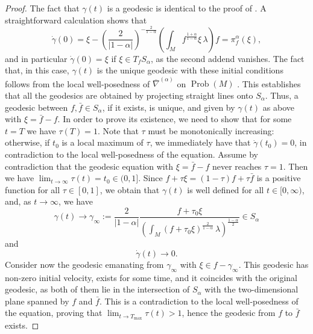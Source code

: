 \documentclass[11pt,reqno]{amsart}
\theoremstyle{definition}
\newtheorem{remark}[theorem]{Remark}
\newcommand{\Prob}{\operatorname{Prob}(M)}
\begin{document}
\begin{proof}
    The fact that $\gamma(t)$ is a geodesic is identical to the proof of \cite[Theorem 4.11]{bauer2024p}.
    A straightforward calculation shows that 
    \[
    \dot\gamma(0) = \xi -\left(\frac{2}{|1-\alpha|}\right)^{-\frac{2}{1-\alpha}}\left(\int_M f^{\frac{1+\alpha}{1-\alpha}}\xi\,\lambda\right) f = \pi^\alpha_f(\xi),
    \]
    and in particular $\dot\gamma(0) = \xi$ if $\xi \in T_f S_\alpha$, as the second addend vanishes.
    The fact that, in this case, $\gamma(t)$ is the unique geodesic with these initial conditions follows from the local well-posedness of $\overline{\nabla}^{(\alpha)}$ on $\Prob$ \cite[Theorem~4.2]{bauer2024p}.
    This establishes that all the geodesics are obtained by projecting straight lines onto $S_\alpha$.
    Thus, a geodesic between $f,\bar{f}\in S_\alpha$, if it exists, is unique, and given by $\gamma(t)$ as above with $\xi = \bar{f}-f$.
    In order to prove its existence, we need to show that for some $t=T$ we have $\tau(T)=1$.
    Note that $\tau$ must be monotonically increasing: otherwise, if $t_0$ is%
    a local maximum of $\tau$, we immediately have that $\dot{\gamma}(t_0)=0$, in contradiction to the local well-posedness of the equation.
    Assume by contradiction that the geodesic equation with $\xi= \bar{f}-f$ never reaches $\tau=1$.
    Then we have $\lim_{t\to \infty}\tau(t) = t_0 \in (0,1]$.
    Since $f + \tau\xi = (1-\tau)f + \tau \bar{f}$ is a positive function for all $\tau\in [0,1]$, we obtain that $\gamma(t)$ is well defined for all $t\in [0,\infty)$, and, as $t\to \infty$, we have
    \[
     \gamma(t) \to \gamma_\infty:=\frac{2}{|1-\alpha|}\frac{f+ \tau_0\xi}{\left(\int_M (f+\tau_0\xi)^{\frac{2}{1-\alpha}}\,\lambda\right)^{\frac{1-\alpha}{2}}}\in S_\alpha
\]
and 
\[
\dot\gamma(t) \to 0.
\]
Consider now the geodesic emanating from $\gamma_\infty$ with $\xi\in f- \gamma_\infty$.
This geodesic has non-zero initial velocity, exists for some time, and it coincides with the original geodesic, as both of them lie in the intersection of $S_\alpha$ with the two-dimensional plane spanned by $f$ and $\bar{f}$.
This is a contradiction to the local well-posedness of the equation, proving that $\lim_{t\to T_{\text{max}}}\tau(t) >1$, hence the geodesic from $f$ to $\bar{f}$ exists.
\end{proof}
\end{document}
